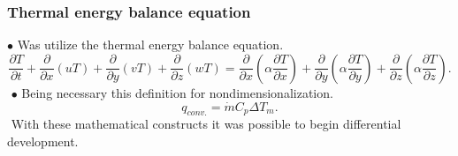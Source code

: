 \documentclass[xcolor=dvipsnames,8pt,aspectratio=34]{beamer}
\begin{document}
	
	
	
		

		



		\begin{frame}
		\frametitle{Thermal energy balance equation}
		$\bullet$ Was utilize the thermal energy balance equation.
		\begin{equation}
		\frac{\partial T}{\partial t} + {\frac{\partial{}}{\partial{x}} (uT)} + {\frac{\partial{}}{\partial{y}} (vT)} + {\frac{\partial{}}{\partial{z}} (wT)}
		=
		{\frac{\partial{}}{\partial{x}}} \left(\alpha {\frac{\partial{T}}{\partial{x}}} \right) +
		{\frac{\partial{}}{\partial{y}}} \left(\alpha {\frac{\partial{T}}{\partial{y}}} \right) +
		{\frac{\partial{}}{\partial{z}}} \left(\alpha {\frac{\partial{T}}{\partial{z}}} \right) .
		\end{equation}
		$ $
		$\bullet$ Being necessary this definition for nondimensionalization.
		\begin{equation}\label{c_h_e}
		q_{conv.} = \dot{m} C_p \Delta T_m.
		\end{equation}
		$ $
		With these mathematical constructs it was possible to begin differential development.
		\end{frame}
\end{document}
